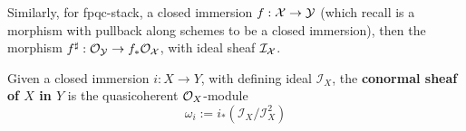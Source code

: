 Similarly, for fpqc-stack, a closed immersion $f: \operatorname{\mathcal{X}}\to \operatorname{\mathcal{Y}}$ (which recall is a morphism with pullback along schemes to be a closed immersion), then the morphism $f^{\operatorname{\sharp}}: \mathcal{O}_{\operatorname{\mathcal{Y}}}\to f_*\mathcal{O}_{\operatorname{\mathcal{X}}}$, with ideal sheaf $\mathcal{I}_{\operatorname{\mathcal{X}}}$.

\begin{definition}
    Given a closed immersion $i: X\to Y$, with defining ideal $\mathcal{I}_X$, the \textbf{conormal sheaf of $X$ in $Y$} is the quasicoherent $\mathcal{O}_X$-module 
    \[
    \omega_i:=i_*(\mathcal{I}_X/\mathcal{I}_X^2)
    \]
\end{definition}